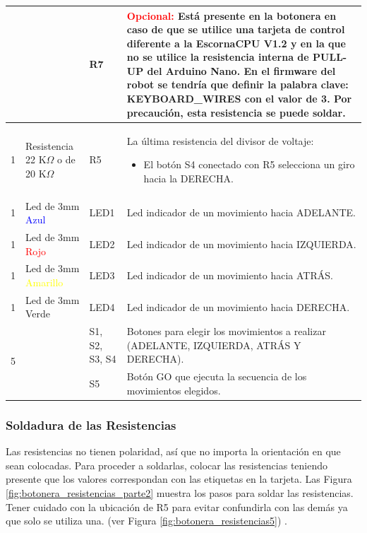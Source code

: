 \documentclass{article}
\begin{document}
\begin{longtable}{|c|>{\raggedright}m{}|>{\centering}m{}|m{}|}
    &  & R7 & \textcolor{red}{Opcional:} Está presente en la botonera en caso de que se utilice una tarjeta de control diferente a la EscornaCPU V1.2 y en la que no se utilice la resistencia interna de PULL-UP del Arduino Nano. En el firmware del robot se tendría que definir la palabra clave: KEYBOARD\_WIRES con el valor de 3. Por precaución, esta resistencia se puede soldar.
    \\ \hline
    1 & Resistencia 22 K$\Omega$ o de 20 K$\Omega$ & R5 & La última resistencia  del divisor de voltaje: 
    \begin{itemize}
        \item El botón S4 conectado con R5 selecciona un giro hacia la DERECHA.
    \end{itemize}
    \\ \hline
    1 & Led de 3mm \textcolor{blue}{Azul} & LED1 & Led indicador de un movimiento hacia ADELANTE.
    \\ \hline
    1 & Led de 3mm \textcolor{red}{Rojo} & LED2 & Led indicador de un movimiento hacia IZQUIERDA.
    \\ \hline
    1 & Led de 3mm \textcolor{yellow}{Amarillo} & LED3 & Led indicador de un movimiento hacia ATRÁS.
    \\ \hline
    1 & Led de 3mm \textcolor{OliveGreen}{Verde} & LED4 & Led indicador de un movimiento hacia DERECHA. 
    \\ \hline
    \multirow{3}{*}{5} & \multirow{3}{*}{Pulsadores de 12mm} & S1, S2, S3, S4 & Botones para elegir los movimientos a realizar (ADELANTE, IZQUIERDA, ATRÁS Y DERECHA).
    \\ \cline{3-4}
    & & S5 & Botón GO que ejecuta la secuencia de los movimientos elegidos.
    \\ \hline 
\end{longtable}

\subsubsection{Soldadura de las Resistencias}
Las resistencias no tienen polaridad, así que no importa la orientación en que sean colocadas. Para proceder a soldarlas, colocar las resistencias teniendo presente que los valores correspondan con las etiquetas en la tarjeta. Las Figura \ref{fig:botonera_resistencias_parte2} muestra los pasos para soldar las resistencias. Tener cuidado con la ubicación de R5 para evitar confundirla con las demás ya que solo se utiliza una. (ver Figura \ref{fig:botonera_resistencias5}) .
\end{document}
